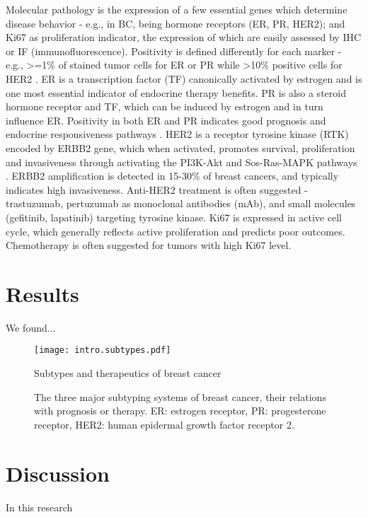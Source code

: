 Molecular pathology is the expression of a few essential genes which determine disease behavior - e.g., in BC, being hormone receptors (ER, PR, HER2); and Ki67 as proliferation indicator, the expression of which are easily assessed by IHC or IF (immunofluorescence). Positivity is defined differently for each marker - e.g., >=1\% of stained tumor cells for ER or PR while >10\% positive cells for HER2 \citep{fragomeni2018molecular}. ER is a transcription factor (TF) canonically activated by estrogen and is one most essential indicator of endocrine therapy benefits. PR is also a steroid hormone receptor and TF, which can be induced by estrogen and in turn influence ER. Positivity in both ER and PR indicates good prognosis and endocrine responsiveness pathways \citep{lange2008challenges}. HER2 is a receptor tyrosine kinase (RTK) encoded by ERBB2 gene, which when activated, promotes survival, proliferation and invasiveness through activating the PI3K-Akt and Sos-Ras-MAPK pathways \citep{hudis2007trastuzumab}. ERBB2 amplification is detected in 15-30\% of breast cancers, and typically indicates high invasiveness. Anti-HER2 treatment is often suggested - trastuzumab, pertuzumab as monoclonal antibodies (mAb), and small molecules (gefitinib, lapatinib) targeting tyrosine kinase. Ki67 is expressed in active cell cycle, which generally reflects active proliferation and predicts poor outcomes. Chemotherapy is often suggested for tumors with high Ki67 level.


\section{Results}

We found... \citep{adams2019current}

\begin{figure}
    \centering
    \texttt{[image: intro.subtypes.pdf]}
    \caption{Subtypes and therapeutics of breast cancer}
    \caption*{The three major subtyping systems of breast cancer, their relations with prognosis or therapy. ER: estrogen receptor, PR: progesterone receptor, HER2: human epidermal growth factor receptor 2.}
    \label{fig:example}
  \end{figure}

\section{Discussion}

In this research \citep{acar2020exploiting}

